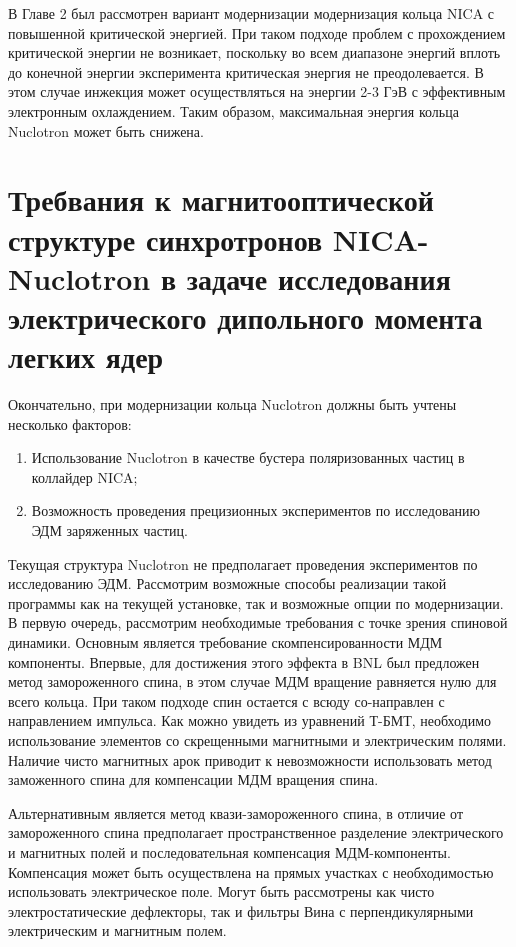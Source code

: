\noindent В Главе 2 был рассмотрен вариант модернизации модернизация кольца NICA с повышенной критической энергией. При таком подходе проблем с прохождением критической энергии не возникает, поскольку во всем диапазоне энергий вплоть до конечной энергии эксперимента критическая энергия не преодолевается. В этом случае инжекция может осуществляться на энергии 2-3 ГэВ с эффективным электронным охлаждением. Таким образом, максимальная энергия кольца Nuclotron может быть снижена.

	\section{Требвания к магнитооптической структуре синхротронов NICA-Nuclotron в задаче исследования электрического дипольного момента легких ядер}\label{sec:EDM/requirements}

Окончательно, при модернизации кольца Nuclotron должны быть учтены несколько факторов:

\begin{enumerate}
    \item Использование Nuclotron в качестве бустера поляризованных частиц в коллайдер NICA;
    \item Возможность проведения прецизионных экспериментов по исследованию ЭДМ заряженных частиц.
\end{enumerate}

\noindent Текущая структура Nuclotron не предполагает проведения экспериментов по исследованию ЭДМ. Рассмотрим возможные способы реализации такой программы как на текущей установке, так и возможные опции по модернизации. В первую очередь, рассмотрим необходимые требования с точке зрения спиновой динамики. Основным является требование скомпенсированности МДМ компоненты. Впервые, для достижения этого эффекта в BNL был предложен метод замороженного спина, в этом случае МДМ вращение равняется нулю для всего кольца. При таком подходе спин остается с всюду со-направлен с направлением импульса. Как можно увидеть из уравнений Т-БМТ, необходимо использование элементов со скрещенными магнитными и электрическим полями. 
Наличие чисто магнитных арок приводит к невозможности использовать метод заможенного спина для компенсации МДМ вращения спина. 
\par Альтернативным является метод квази-замороженного спина, в отличие от замороженного спина предполагает пространственное разделение электрического и магнитных полей и последовательная компенсация МДМ-компоненты. Компенсация может быть осуществлена на прямых участках с необходимостью использовать электрическое поле. Могут быть рассмотрены как чисто электростатические дефлекторы, так и фильтры Вина с перпендикулярными электрическим и магнитным полем.

